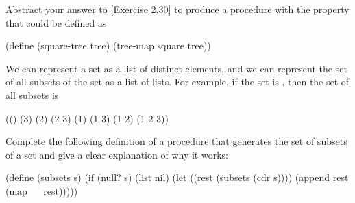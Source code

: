 \begin{exercise}
	\label{Exercise 2.31}
	Abstract your answer to \cref{Exercise 2.30} to produce a procedure  with the property that  could be defined as
	\begin{scheme}
	  (define (square-tree tree) (tree-map square tree))
	\end{scheme}
\end{exercise}



\begin{exercise}
	\label{Exercise 2.32}
	We can represent a set as a list of distinct elements, and we can represent the set of all subsets of the set as a list of lists.
	For example, if the set is , then the set of all subsets is
	\begin{example}
	  (() (3) (2) (2 3) (1) (1 3) (1 2) (1 2 3))
	\end{example}
	Complete the following definition of a procedure that generates the set of subsets of a set and give a clear explanation of why it works:
	\begin{scheme}
	  (define (subsets s)
	    (if (null? s)
	        (list nil)
	        (let ((rest (subsets (cdr s))))
	        (append rest (map ~~ rest)))))
	\end{scheme}
\end{exercise}
